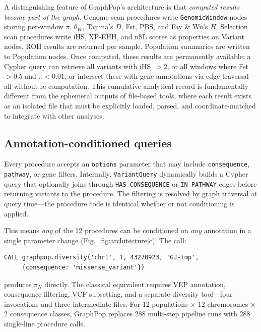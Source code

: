 A distinguishing feature of GraphPop's architecture is that \emph{computed results become part of the graph}. Genome scan procedures write \texttt{GenomicWindow} nodes storing per-window $\pi$, $\theta_W$, Tajima's $D$, Fst, PBS, and Fay \& Wu's $H$. Selection scan procedures write iHS, XP-EHH, and nSL scores as properties on Variant nodes. ROH results are returned per sample. Population summaries are written to Population nodes. Once computed, these results are permanently available: a Cypher query can retrieve all variants with iHS~$> 2$, or all windows where Fst~$> 0.5$ and $\pi < 0.01$, or intersect these with gene annotations via edge traversal---all without re-computation. This cumulative analytical record is fundamentally different from the ephemeral outputs of file-based tools, where each result exists as an isolated file that must be explicitly loaded, parsed, and coordinate-matched to integrate with other analyses.

\subsection*{Annotation-conditioned queries}

Every procedure accepts an \texttt{options} parameter that may include \texttt{consequence}, \texttt{pathway}, or gene filters. Internally, \texttt{VariantQuery} dynamically builds a Cypher query that optionally joins through \texttt{HAS\_CONSEQUENCE} or \texttt{IN\_PATHWAY} edges before returning variants to the procedure. The filtering is resolved by graph traversal at query time---the procedure code is identical whether or not conditioning is applied.

This means \emph{any} of the 12 procedures can be conditioned on \emph{any} annotation in a single parameter change (Fig.~\ref{fig:architecture}c). The call:

\begin{verbatim}
CALL graphpop.diversity('chr1', 1, 43270923, 'GJ-tmp',
     {consequence: 'missense_variant'})
\end{verbatim}

\noindent produces $\pi_N$ directly. The classical equivalent requires VEP annotation, consequence filtering, VCF subsetting, and a separate diversity tool---four invocations and three intermediate files. For 12 populations $\times$ 12 chromosomes $\times$ 2 consequence classes, GraphPop replaces 288 multi-step pipeline runs with 288 single-line procedure calls.

